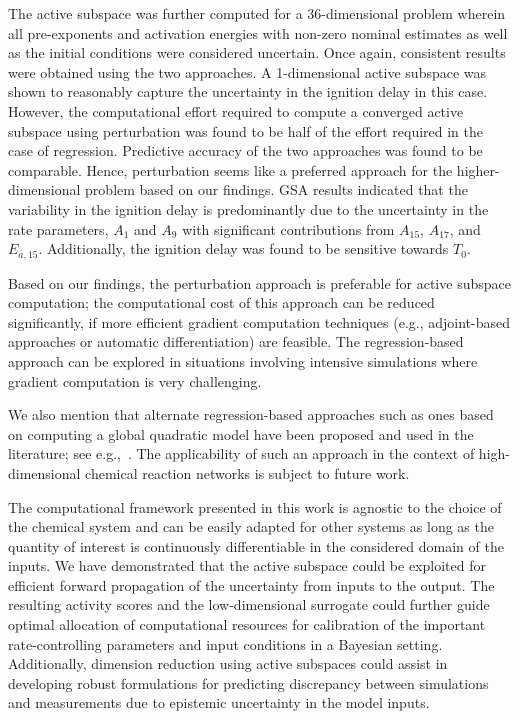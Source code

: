 The active subspace was further computed for a 36-dimensional problem
wherein all pre-exponents and activation energies with non-zero nominal
estimates as well as the initial conditions were considered uncertain. 
Once again, consistent results were obtained using the two approaches.
A 1-dimensional active subspace was shown to reasonably
capture the uncertainty in the ignition delay in this case. However, the
computational effort required to compute a converged active subspace
using perturbation was found to be half of the effort required in the case
of regression. Predictive accuracy of the two approaches was found to 
be comparable. Hence, perturbation seems like a preferred approach
for the higher-dimensional problem based on our findings. GSA results indicated
that the variability in the ignition delay is predominantly due to the 
uncertainty in the rate parameters, $A_1$ and $A_9$ with significant
contributions from $A_{15}$, $A_{17}$, and $E_{a,15}$. Additionally, the
ignition delay was found to be sensitive towards $T_0$.

Based on our findings, the perturbation approach is preferable for active
subspace computation; the computational cost of this approach can be reduced
significantly, if more efficient gradient computation techniques (e.g.,
adjoint-based approaches or automatic differentiation) are feasible. The
regression-based approach can be explored in situations involving intensive
simulations where gradient computation is very challenging. 

%
%
We also mention that alternate regression-based approaches such as ones based
on computing a global quadratic model have been proposed and used in the
literature; see e.g.,~\cite{Constantine:2017a}.  The applicability of such an
approach in the context of high-dimensional chemical reaction networks is
subject to future work. 

The computational framework presented in this work is agnostic to the choice of
the chemical system and can be easily adapted for other systems as long as the
quantity of interest is continuously differentiable in the considered domain of
the inputs.  We have demonstrated that the active subspace could be exploited
for efficient forward propagation of the uncertainty from inputs to the output.
The resulting activity scores and the low-dimensional surrogate could further
guide optimal allocation of computational resources for calibration of the
important rate-controlling parameters and input conditions in a
Bayesian setting.  Additionally, dimension reduction using active subspaces
could assist in developing robust formulations for predicting discrepancy
between simulations and measurements due to epistemic uncertainty in the model
inputs.
